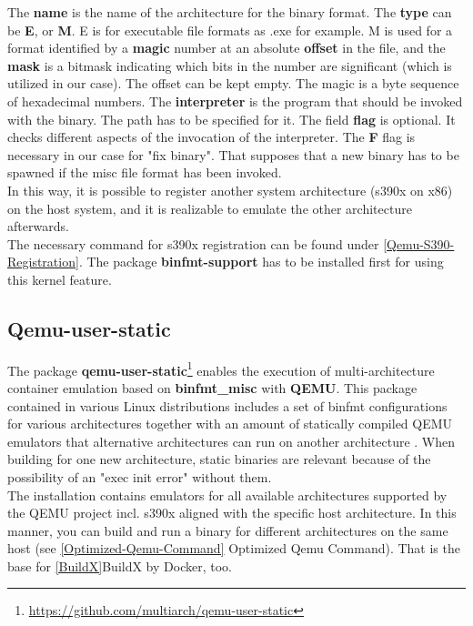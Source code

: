The \textbf{name} is the name of the architecture for the binary format. The \textbf{type} can be \textbf{E}, or \textbf{M}. E is for executable file formats as .exe for example. M is used for a format identified by a \textbf{magic} number at an absolute \textbf{offset} in the file, and the \textbf{mask} is a bitmask indicating which bits in the number are significant\cite{Slackware2020} (which is utilized in our case). 
The offset can be kept empty. The magic is a byte sequence of hexadecimal numbers. The \textbf{interpreter} is the program that should be invoked with the binary\cite{Guenther2020}. 
The path has to be specified for it. The field \textbf{flag} is optional. It checks different aspects of the invocation of the interpreter. The \textbf{F} flag is necessary in our case for "fix binary". 
That supposes that a new binary has to be spawned if the misc file format has been invoked.\\
In this way, it is possible to register another system architecture (s390x on x86) on the host system, and it is realizable to emulate the other architecture afterwards. \\
The necessary command for s390x registration can be found under \ref{Qemu-S390-Registration}.
The package \textbf{binfmt-support} has to be installed first for using this kernel feature. 

\subsection{Qemu-user-static}

The package \textbf{qemu-user-static}\footnote{\url{https://github.com/multiarch/qemu-user-static}} enables the execution of multi-architecture container emulation based on \textbf{binfmt\_misc} with \textbf{QEMU}. This package contained in various Linux distributions includes a set of binfmt configurations for various architectures together with an amount of statically compiled QEMU emulators that alternative architectures can run on another architecture \cite{Yang2019}. When building for one new architecture, static binaries are relevant because of the possibility of an "exec init error" without them. \\
The installation contains emulators for all available architectures supported by the QEMU project incl. s390x aligned with the specific host architecture. In this manner, you can build and run a binary for different architectures on the same host (see \ref{Optimized-Qemu-Command} Optimized Qemu Command). That is the base for \ref{BuildX}BuildX by Docker, too.

